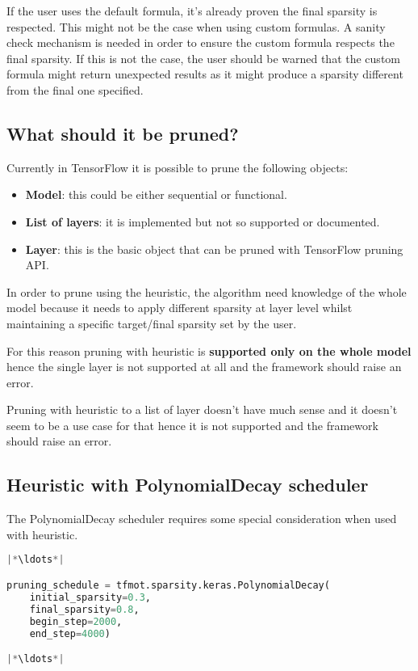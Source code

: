 If the user uses the default formula, it's already proven the final sparsity is
respected. This might not be the case when using custom formulas.
A sanity check mechanism is needed in order to ensure the custom formula
respects the final sparsity. If this is not the case, the user should be warned
that the custom formula might return unexpected results as it might produce a
sparsity different from the final one specified.

\subsection{What should it be pruned?}
Currently in TensorFlow it is possible to prune the following objects:
\begin{itemize}
    \item \textbf{Model}: this could be either sequential or functional.
    \item \textbf{List of layers}: it is implemented but not so supported or
        documented.
    \item \textbf{Layer}: this is the basic object that can be pruned with
        TensorFlow pruning API\@.
\end{itemize}

In order to prune using the heuristic, the algorithm need knowledge of the
whole model because it needs to apply different sparsity at layer level whilst
maintaining a specific target/final sparsity set by the user.

For this reason pruning with heuristic is \textbf{supported only on the whole
model} hence the single layer is not supported at all and the framework should
raise an error.

Pruning with heuristic to a list of layer doesn't have much sense and it
doesn't seem to be a use case for that hence it is not supported and the
framework should raise an error.

\subsection{Heuristic with PolynomialDecay scheduler}
The PolynomialDecay scheduler requires some special consideration when used
with heuristic.

\begin{lstlisting}[language=Python, label={lst:polynomialdecay},
    caption=PolynomialDecay Scheduler in TFMOT]
|*\ldots*|

pruning_schedule = tfmot.sparsity.keras.PolynomialDecay(
    initial_sparsity=0.3,
    final_sparsity=0.8,
    begin_step=2000,
    end_step=4000)

|*\ldots*|
\end{lstlisting}

